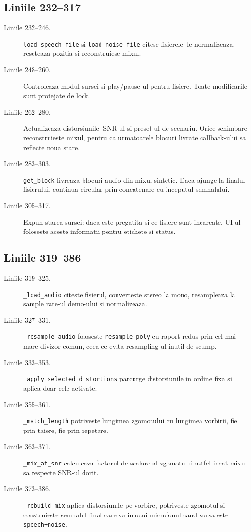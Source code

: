 \documentclass[12pt,a4paper]{report}
\newcommand{\chunk}[3]{\subsection*{Liniile #2--#3}}
\begin{document}
\chunk{../src/tools/realtime/common.py}{232}{317}

\begin{description}
    \item[Liniile 232--246.] \texttt{load\_speech\_file} si \texttt{load\_noise\_file}
    citesc fisierele, le normalizeaza, reseteaza pozitia si reconstruiesc mixul.
    \item[Liniile 248--260.] Controleaza modul sursei si play/pause-ul pentru
    fisiere. Toate modificarile sunt protejate de lock.
    \item[Liniile 262--280.] Actualizeaza distorsiunile, SNR-ul si preset-ul de
    scenariu. Orice schimbare reconstruieste mixul, pentru ca urmatoarele blocuri
    livrate callback-ului sa reflecte noua stare.
    \item[Liniile 283--303.] \texttt{get\_block} livreaza blocuri audio din mixul
    sintetic. Daca ajunge la finalul fisierului, continua circular prin concatenare
    cu inceputul semnalului.
    \item[Liniile 305--317.] Expun starea sursei: daca este pregatita si ce fisiere
    sunt incarcate. UI-ul foloseste aceste informatii pentru etichete si status.
\end{description}

\chunk{../src/tools/realtime/common.py}{319}{386}

\begin{description}
    \item[Liniile 319--325.] \texttt{\_load\_audio} citeste fisierul, converteste
    stereo la mono, resampleaza la sample rate-ul demo-ului si normalizeaza.
    \item[Liniile 327--331.] \texttt{\_resample\_audio} foloseste \texttt{resample\_poly}
    cu raport redus prin cel mai mare divizor comun, ceea ce evita resampling-ul
    inutil de scump.
    \item[Liniile 333--353.] \texttt{\_apply\_selected\_distortions} parcurge
    distorsiunile in ordine fixa si aplica doar cele activate.
    \item[Liniile 355--361.] \texttt{\_match\_length} potriveste lungimea zgomotului
    cu lungimea vorbirii, fie prin taiere, fie prin repetare.
    \item[Liniile 363--371.] \texttt{\_mix\_at\_snr} calculeaza factorul de scalare
    al zgomotului astfel incat mixul sa respecte SNR-ul dorit.
    \item[Liniile 373--386.] \texttt{\_rebuild\_mix} aplica distorsiunile pe vorbire,
    potriveste zgomotul si construieste semnalul final care va inlocui microfonul
    cand sursa este \texttt{speech+noise}.
\end{description}
\end{document}
